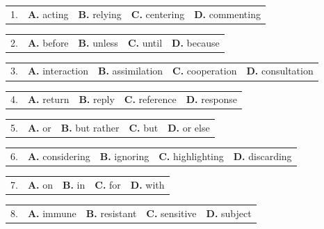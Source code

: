 \documentclass[UTF8,11pt]{ctexart}
\begin{document}
\noindent\begin{tabularx}{\linewidth}{@{}lXXXX@{}}1. & \textbf{A.} acting & \textbf{B.} relying & \textbf{C.} centering & \textbf{D.} commenting\\\end{tabularx}\par

\noindent\begin{tabularx}{\linewidth}{@{}lXXXX@{}}2. & \textbf{A.} before & \textbf{B.} unless & \textbf{C.} until & \textbf{D.} because\\\end{tabularx}\par

\noindent\begin{tabularx}{\linewidth}{@{}lXXXX@{}}3. & \textbf{A.} interaction & \textbf{B.} assimilation & \textbf{C.} cooperation & \textbf{D.} consultation\\\end{tabularx}\par

\noindent\begin{tabularx}{\linewidth}{@{}lXXXX@{}}4. & \textbf{A.} return & \textbf{B.} reply & \textbf{C.} reference & \textbf{D.} response\\\end{tabularx}\par

\noindent\begin{tabularx}{\linewidth}{@{}lXXXX@{}}5. & \textbf{A.} or & \textbf{B.} but rather & \textbf{C.} but & \textbf{D.} or else\\\end{tabularx}\par

\noindent\begin{tabularx}{\linewidth}{@{}lXXXX@{}}6. & \textbf{A.} considering & \textbf{B.} ignoring & \textbf{C.} highlighting & \textbf{D.} discarding\\\end{tabularx}\par

\noindent\begin{tabularx}{\linewidth}{@{}lXXXX@{}}7. & \textbf{A.} on & \textbf{B.} in & \textbf{C.} for & \textbf{D.} with\\\end{tabularx}\par

\noindent\begin{tabularx}{\linewidth}{@{}lXXXX@{}}8. & \textbf{A.} immune & \textbf{B.} resistant & \textbf{C.} sensitive & \textbf{D.} subject\\\end{tabularx}\par
\end{document}
